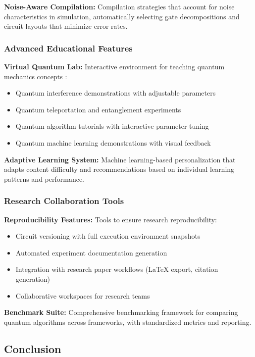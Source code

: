 \textbf{Noise-Aware Compilation:} Compilation strategies that account for noise characteristics in simulation, automatically selecting gate decompositions and circuit layouts that minimize error rates.

\subsubsection{Advanced Educational Features}

\textbf{Virtual Quantum Lab:} Interactive environment for teaching quantum mechanics concepts \cite{migdal2022visualizing}:
\begin{itemize}
    \item Quantum interference demonstrations with adjustable parameters
    \item Quantum teleportation and entanglement experiments
    \item Quantum algorithm tutorials with interactive parameter tuning
    \item Quantum machine learning demonstrations with visual feedback
\end{itemize}

\textbf{Adaptive Learning System:} Machine learning-based personalization that adapts content difficulty and recommendations based on individual learning patterns and performance.

\subsubsection{Research Collaboration Tools}

\textbf{Reproducibility Features:} Tools to ensure research reproducibility:
\begin{itemize}
    \item Circuit versioning with full execution environment snapshots
    \item Automated experiment documentation generation
    \item Integration with research paper workflows (LaTeX export, citation generation)
    \item Collaborative workspaces for research teams
\end{itemize}

\textbf{Benchmark Suite:} Comprehensive benchmarking framework for comparing quantum algorithms across frameworks, with standardized metrics and reporting.

\subsection{Conclusion}

